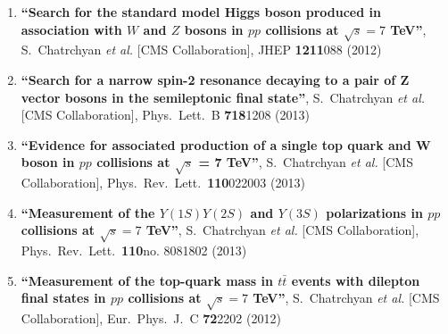 \begin{enumerate}
\item%
{\bf ``Search for the standard model Higgs boson produced in association with $W$ and $Z$ bosons in $pp$ collisions at $\sqrt{s}=7$ TeV''}, 
  S.~Chatrchyan {\it et al.}  [CMS Collaboration], 
JHEP {\bf 1211}088 (2012) %


\item%
{\bf ``Search for a narrow spin-2 resonance decaying to a pair of Z vector bosons in the semileptonic final state''}, 
  S.~Chatrchyan {\it et al.}  [CMS Collaboration], 
Phys.\ Lett.\ B {\bf 718}1208 (2013) %


\item%
{\bf ``Evidence for associated production of a single top quark and W boson in $pp$ collisions at $\sqrt{s}$ = 7 TeV''}, 
  S.~Chatrchyan {\it et al.}  [CMS Collaboration], 
Phys.\ Rev.\ Lett.\  {\bf 110}022003 (2013) %


\item%
{\bf ``Measurement of the $Y(1S)Y(2S)$ and $Y(3S)$ polarizations in $pp$ collisions at $\sqrt{s}=7$ TeV''}, 
  S.~Chatrchyan {\it et al.}  [CMS Collaboration], 
Phys.\ Rev.\ Lett.\  {\bf 110}no. 8081802 (2013) %


\item%
{\bf ``Measurement of the top-quark mass in $t\bar{t}$ events with dilepton final states in $pp$ collisions at $\sqrt{s}=7$ TeV''}, 
  S.~Chatrchyan {\it et al.}  [CMS Collaboration], 
Eur.\ Phys.\ J.\ C {\bf 72}2202 (2012) %



\end{enumerate}
